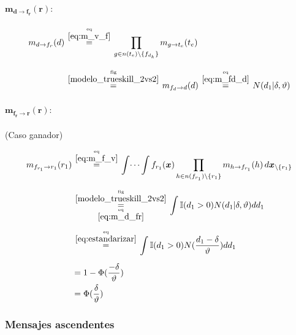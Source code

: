 \documentclass[article]{jss}
\newcommand\hfrac[2]{\genfrac{}{}{0pt}{}{#1}{#2}} %
\begin{document}
\begin{appendix}
\paragraph{$\bm{m_{d \rightarrow f_r}(r)}:$}

\begin{equation}\label{eq:m_d_fr}
\begin{split}
m_{d \rightarrow f_r}(d) & \overset{\hfrac{\text{eq}}{\ref{eq:m_v_f}}}{=} \prod_{g \in n(t_e) \setminus  \{f_{d_{k}} \}} m_{g \rightarrow t_e} (t_e) \\[0.3cm]
 & \overset{\hfrac{\text{fig}}{\ref{modelo_trueskill_2vs2}}}{=} m_{f_d \rightarrow d}(d) \overset{\hfrac{\text{eq}}{\ref{eq:m_fd_d}}}{=} N(d_1| \delta, \vartheta)
\end{split}
\end{equation}

\paragraph{$\bm{m_{f_r \rightarrow r}(r)}:$} (Caso ganador)

\begin{equation}\label{eq:m_fr_r}
\begin{split}
 m_{f_{r_1} \rightarrow r_1}(r_1) & \overset{\hfrac{\text{eq}}{\ref{eq:m_f_v}}}{=} \int \dots \int f_{r_1}(\bm{x}) \prod_{h \in n(f_{r_1}) \setminus \{r_1\} } m_{h \rightarrow f_{r_1}}(h) \, d\bm{x}_{\setminus \{r_1\} }  \\[0.2cm]
 & \overset{\hfrac{\text{fig}}{\ref{modelo_trueskill_2vs2}}}{\underset{\hfrac{\text{eq}}{\ref{eq:m_d_fr}}}{=}} \int \mathbb{I}(d_1 > 0) N(d_1 | \delta, \vartheta)  dd_1 \\[0.2cm]
 &  \overset{\hfrac{\text{eq}}{\ref{eq:estandarizar}}}{=} \int \mathbb{I}(d_1 > 0) N( \frac{d_1 - \delta}{\vartheta}) dd_1 \\[0.2cm]
 & = 1 - \Phi(\frac{-\delta}{\vartheta}) \\
 & = \Phi(\frac{\delta}{\vartheta})
\end{split}
\end{equation}













\subsubsection{Mensajes ascendentes}


\end{appendix}
\end{document}

